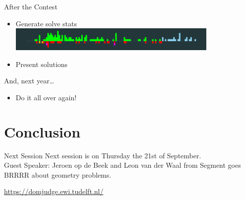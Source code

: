 \documentclass[11pt,pdf, aspectratio=169]{beamer}
\begin{document}
  \begin{frame}{After the Contest}
    \begin{itemize}
      \item Generate solve stats \\[0.5em]
      \includegraphics[width=0.8\textwidth]{images/session-3/solve-stats.png}
      \item Present solutions
    \end{itemize}

    \vspace{2em}
    And, next year\dots

    \begin{itemize}
      \item Do it all over again!
    \end{itemize}
  \end{frame}
  \section{Conclusion}
  \begin{frame}{Next Session}
    Next session is on Thursday the 21st of September.\\
    Guest Speaker: Jeroen op de Beek and Leon van der Waal from Segment goes BRRRR about geometry problems.

    \url{https://domjudge.ewi.tudelft.nl/}
  \end{frame}
\end{document}
